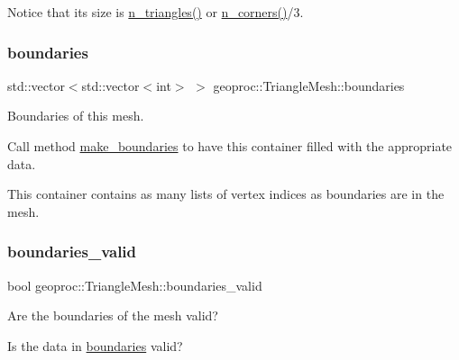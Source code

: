Notice that its size is \hyperlink{classgeoproc_1_1TriangleMesh_ac6db86ebd1e12d187f4bd4fcbb1e0809}{n\+\_\+triangles()} or \hyperlink{classgeoproc_1_1TriangleMesh_a6b8c186ba032170de9d4f36b4c1d298b}{n\+\_\+corners()}/3. \mbox{\label{classgeoproc_1_1TriangleMesh_a57162eac37831c87786a8dab8331d72f}} 
\subsubsection{\texorpdfstring{boundaries}{boundaries}}
{\footnotesize\ttfamily std\+::vector$<$std\+::vector$<$int$>$ $>$ geoproc\+::\+Triangle\+Mesh\+::boundaries\hspace{0.3cm}{\ttfamily [protected]}}



Boundaries of this mesh. 

Call method \hyperlink{classgeoproc_1_1TriangleMesh_ad11c9406e2677e4d72d53837206fd769}{make\+\_\+boundaries} to have this container filled with the appropriate data.

This container contains as many lists of vertex indices as boundaries are in the mesh. \mbox{\label{classgeoproc_1_1TriangleMesh_a1384fa834aaa4ec3dc7c3b025b1ca528}} 
\subsubsection{\texorpdfstring{boundaries\+\_\+valid}{boundaries\_valid}}
{\footnotesize\ttfamily bool geoproc\+::\+Triangle\+Mesh\+::boundaries\+\_\+valid\hspace{0.3cm}{\ttfamily [protected]}}



Are the boundaries of the mesh valid? 

Is the data in \hyperlink{classgeoproc_1_1TriangleMesh_a57162eac37831c87786a8dab8331d72f}{boundaries} valid? \mbox{\label{classgeoproc_1_1TriangleMesh_a142a764ddf07b98c7efcd596d88c3f87}} 
